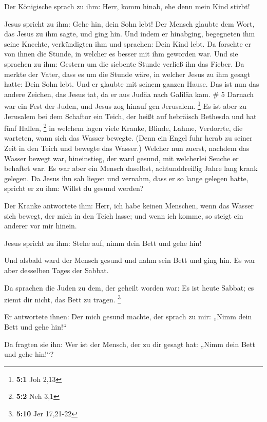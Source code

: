  Der Königische sprach zu ihm: Herr, komm hinab, ehe denn
mein Kind stirbt!

 Jesus spricht zu ihm: Gehe hin, dein Sohn lebt! Der Mensch
glaubte dem Wort, das Jesus zu ihm sagte, und ging hin. 
Und indem er hinabging, begegneten ihm seine Knechte, verkündigten ihm
und sprachen: Dein Kind lebt.  Da forschte er von ihnen die
Stunde, in welcher es besser mit ihm geworden war. Und sie sprachen zu
ihm: Gestern um die siebente Stunde verließ ihn das Fieber.
 Da merkte der Vater, dass es um die Stunde wäre, in
welcher Jesus zu ihm gesagt hatte: Dein Sohn lebt. Und er glaubte mit
seinem ganzen Hause.  Das ist nun das andere Zeichen, das
Jesus tat, da er aus Judäa nach Galiläa kam. \# 5  Darnach
war ein Fest der Juden, und Jesus zog hinauf gen Jerusalem. \footnote{\textbf{5:1}
  Joh 2,13}  Es ist aber zu Jerusalem bei dem Schaftor ein
Teich, der heißt auf hebräisch Bethesda und hat fünf Hallen, \footnote{\textbf{5:2}
  Neh 3,1}  in welchem lagen viele Kranke, Blinde, Lahme,
Verdorrte, die warteten, wann sich das Wasser bewegte. 
(Denn ein Engel fuhr herab zu seiner Zeit in den Teich und bewegte das
Wasser.) Welcher nun zuerst, nachdem das Wasser bewegt war, hineinstieg,
der ward gesund, mit welcherlei Seuche er behaftet war.  Es
war aber ein Mensch daselbst, achtunddreißig Jahre lang krank gelegen.
 Da Jesus ihn sah liegen und vernahm, dass er so lange
gelegen hatte, spricht er zu ihm: Willst du gesund werden?

 Der Kranke antwortete ihm: Herr, ich habe keinen Menschen,
wenn das Wasser sich bewegt, der mich in den Teich lasse; und wenn ich
komme, so steigt ein anderer vor mir hinein.

 Jesus spricht zu ihm: Stehe auf, nimm dein Bett und gehe
hin!

 Und alsbald ward der Mensch gesund und nahm sein Bett und
ging hin. Es war aber desselben Tages der Sabbat.

 Da sprachen die Juden zu dem, der geheilt worden war: Es
ist heute Sabbat; es ziemt dir nicht, das Bett zu tragen. \footnote{\textbf{5:10}
  Jer 17,21-22}

 Er antwortete ihnen: Der mich gesund machte, der sprach zu
mir: „Nimm dein Bett und gehe hin!{}``

 Da fragten sie ihn: Wer ist der Mensch, der zu dir gesagt
hat: „Nimm dein Bett und gehe hin!{}``?

